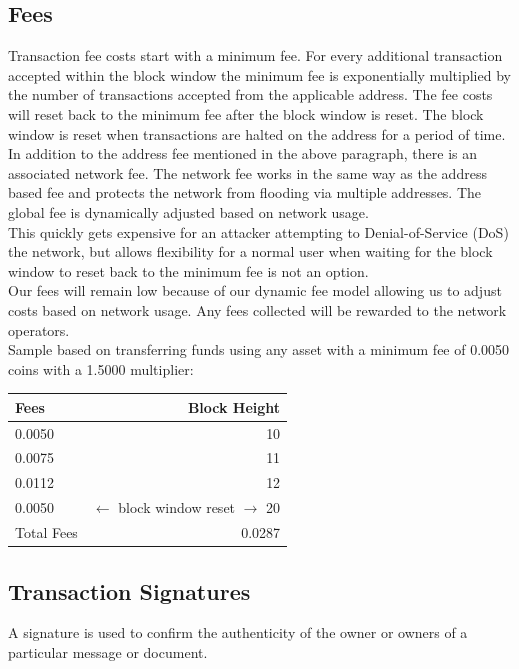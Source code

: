 \documentclass[12pt,a4paper]{article}
\begin{document}
  \subsection{Fees}
  Transaction fee costs start with a minimum fee. For every additional
  transaction accepted within the block window the minimum fee is exponentially
  multiplied by the number of transactions accepted from the applicable address.
  The fee costs will reset back to the minimum fee after the block window is
  reset. The block window is reset when transactions are halted on the address
  for a period of time.\\

  In addition to the address fee mentioned in the above paragraph, there is an
  associated  network fee. The network fee works in the same way as
  the address based fee and protects the network from flooding via multiple
  addresses. The global fee is dynamically adjusted based on network usage.\\

  This quickly gets expensive for an attacker attempting to Denial-of-Service
  (DoS) the network, but allows flexibility for a normal user when waiting for
  the block window to reset back to the minimum fee is not an option.\\

  Our fees will remain low because of our dynamic fee model allowing us to
  adjust costs based on network usage. Any fees collected will be rewarded to
  the network operators.\\

  Sample based on transferring funds using any asset with a minimum fee of
  0.0050 coins with a 1.5000 multiplier:

  \vspace{3mm}
  \begin{tabular}{@{}lr@{}}
    Fees & Block Height     \\ \toprule
    0.0050 & 10             \\
    0.0075 & 11             \\
    0.0112 & 12             \\
    0.0050 & $\leftarrow{}$ block window reset $\rightarrow{}$ 20 \\ \midrule{}
    Total Fees & 0.0287     \\
    \bottomrule
  \end{tabular}

  \subsection{Transaction Signatures}
  A signature is used to confirm the authenticity of the owner or owners
  of a particular message or document.\\
\end{document}
